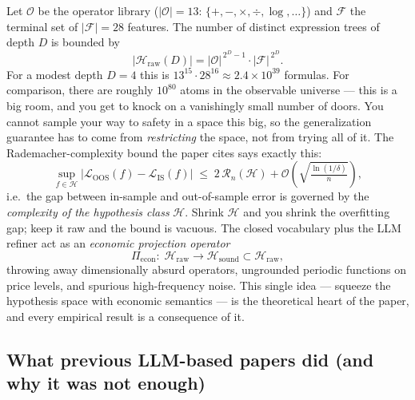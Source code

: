 \documentclass[11pt,a4paper]{article}
\begin{document}
\begin{themath}
Let $\mathcal{O}$ be the operator library ($|\mathcal{O}| = 13$:
$\{+,-,\times,\div,\log,\dots\}$) and $\mathcal{F}$ the terminal set of
$|\mathcal{F}| = 28$ features. The number of distinct expression trees of depth
$D$ is bounded by
\begin{equation}
  \bigl|\mathcal{H}_{\text{raw}}(D)\bigr|
  = |\mathcal{O}|^{\,2^{D}-1}\cdot|\mathcal{F}|^{\,2^{D}} .
  \label{eq:cardinality}
\end{equation}
For a modest depth $D = 4$ this is $13^{15}\cdot 28^{16} \approx 2.4\times
10^{39}$ formulas. For comparison, there are roughly $10^{80}$ atoms in the
observable universe --- this is a big room, and you get to knock on a vanishingly
small number of doors. You cannot sample your way to safety in a space this big,
so the generalization guarantee has to come from \emph{restricting} the space,
not from trying all of it. The Rademacher-complexity bound the paper cites says
exactly this:
\begin{equation}
  \sup_{f\in\mathcal{H}}
  \bigl|\mathcal{L}_{\text{OOS}}(f) - \mathcal{L}_{\text{IS}}(f)\bigr|
  \;\le\; 2\,\mathcal{R}_n(\mathcal{H})
  + \mathcal{O}\!\left(\sqrt{\tfrac{\ln(1/\delta)}{n}}\right),
  \label{eq:rademacher}
\end{equation}
i.e.\ the gap between in-sample and out-of-sample error is governed by the
\emph{complexity of the hypothesis class} $\mathcal{H}$. Shrink $\mathcal{H}$
and you shrink the overfitting gap; keep it raw and the bound is vacuous. The
closed vocabulary plus the LLM refiner act as an \emph{economic projection
operator}
\begin{equation}
  \Pi_{\text{econ}}:\; \mathcal{H}_{\text{raw}} \longrightarrow
  \mathcal{H}_{\text{sound}} \subset \mathcal{H}_{\text{raw}},
  \label{eq:projection}
\end{equation}
throwing away dimensionally absurd operators, ungrounded periodic functions on
price levels, and spurious high-frequency noise. This single idea --- squeeze
the hypothesis space with economic semantics --- is the theoretical heart of
the paper, and every empirical result is a consequence of it.
\end{themath}

\subsection{What previous LLM-based papers did (and why it was not enough)}
\end{document}
